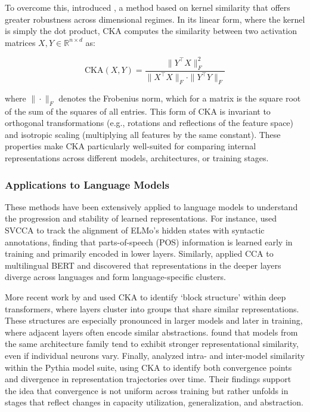 To overcome this, \citet{kornblith2019cka} introduced , a method based on kernel similarity that offers greater robustness across dimensional regimes. In its linear form, where the kernel is simply the dot product, CKA computes the similarity between two activation matrices \( X, Y \in \mathbb{R}^{n \times d} \) as:

\[
\mathrm{CKA}(X, Y) = \frac{\| Y^\top X \|_F^2}{\| X^\top X \|_F \cdot \| Y^\top Y \|_F}
\]

where \( \|\cdot\|_F \) denotes the Frobenius norm, which for a matrix is the square root of the sum of the squares of all entries. This form of CKA is invariant to orthogonal transformations (e.g., rotations and reflections of the feature space) and isotropic scaling (multiplying all features by the same constant). These properties make CKA particularly well-suited for comparing internal representations across different models, architectures, or training stages.
 
\subsubsection{Applications to Language Models}

These methods have been extensively applied to language models to understand the progression and stability of learned representations. For instance, \citet{saphra2019understanding} used SVCCA to track the alignment of ELMo's hidden states with syntactic annotations, finding that parts-of-speech (POS) information is learned early in training and primarily encoded in lower layers. Similarly, \citet{singh2019bert} applied CCA to multilingual BERT and discovered that representations in the deeper layers diverge across languages and form language-specific clusters.

More recent work by \citet{nguyen2020wide} and \citet{phang2021finetuned} used CKA to identify `block structure' within deep transformers, where layers cluster into groups that share similar representations. These structures are especially pronounced in larger models and later in training, where adjacent layers often encode similar abstractions. \citet{wu2020similarity} found that models from the same architecture family tend to exhibit stronger representational similarity, even if individual neurons vary. Finally, \citet{brown2023understanding} analyzed intra- and inter-model similarity within the Pythia model suite, using CKA to identify both convergence points and divergence in representation trajectories over time. Their findings support the idea that convergence is not uniform across training but rather unfolds in stages that reflect changes in capacity utilization, generalization, and abstraction.

